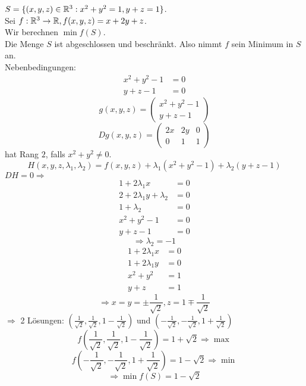 \documentclass[../ana2u.tex]{subfiles}
\begin{document}
\begin{bsp}
    \( S = \{ (x,y,z) \in \mathbb{R}^3 : x^2 + y^2 = 1, y + z = 1 \} \).\\
    Sei \( f:\mathbb{R}^3\rightarrow \mathbb{R}, f(x,y,z) = x + 2y + z \).\\
    Wir berechnen \( \min f(S) \).\\
    Die Menge \(S\) ist abgeschlossen und beschränkt. Also nimmt \(f\)
    sein Minimum in \(S\) an.\\
    Nebenbedingungen:
    \begin{align*}
        x^2+y^2-1 &= 0 \\
        y + z - 1 &= 0
    \end{align*}
    \[ g(x,y,z) = \begin{pmatrix}
        x^2 + y^2 - 1 \\
        y + z - 1
    \end{pmatrix} \]
    \[ Dg(x,y,z) = \begin{pmatrix}
        2x & 2y & 0\\
        0 & 1 & 1
    \end{pmatrix} \]
    hat Rang \(2\), falls \(x^2+y^2 \neq 0\).
    \[ H(x,y,z,\lambda_1, \lambda_2) = f(x,y,z) 
    + \lambda_1 (x^2 + y^2 - 1) + \lambda_2 (y + z - 1) \]
    \(DH = 0 \Rightarrow\)
    \begin{align*}
        1+2\lambda_1x &= 0\\
        2+2\lambda_1y + \lambda_2 &= 0\\
        1+\lambda_2 &= 0\\
        x^2+y^2-1 &= 0\\
        y+z-1 &= 0
    \end{align*}
    \[ \Rightarrow \lambda_2 = -1 \]
    \begin{align*}
        1+2\lambda_1x &= 0\\
        1+2\lambda_1y &= 0\\
        x^2+y^2 &= 1\\
        y+z &= 1
    \end{align*}
    \[ \Rightarrow x = y = \pm \frac{1}{\sqrt{2}}, z = 1 \mp \frac{1}{\sqrt{2}} \]
    \(\Rightarrow\) 2 Lösungen: \((\frac{1}{\sqrt{2}}, \frac{1}{\sqrt{2}}, 1-\frac{1}{\sqrt{2}})\) 
    und \((-\frac{1}{\sqrt{2}}, -\frac{1}{\sqrt{2}}, 1+ \frac{1}{\sqrt{2}})\)
    \[ f( \frac{1}{\sqrt{2}}, \frac{1}{\sqrt{2}}, 1 - \frac{1}{\sqrt{2}} ) 
    = 1 + \sqrt{2} \Rightarrow \max \]
    \[ f( -\frac{1}{\sqrt{2}}, -\frac{1}{\sqrt{2}}, 1 + \frac{1}{\sqrt{2}} ) 
    = 1 - \sqrt{2} \Rightarrow \min \]
    \[\Rightarrow \min f(S) = 1-\sqrt{2}\]
\end{bsp}
\end{document}
